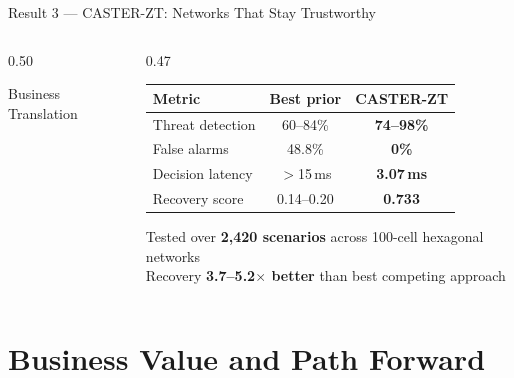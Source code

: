 \documentclass[aspectratio=169,t,10pt]{beamer}
\begin{document}
\begin{frame}[shrink=12]{Result 3 --- CASTER-ZT: Networks That Stay Trustworthy}
\begin{columns}[T]
\begin{column}{0.50\textwidth}
\begin{exampleblock}{\faBriefcase\; Business Translation}
  \end{exampleblock}
\end{column}
\begin{column}{0.47\textwidth}
  \centering\small
  \renewcommand{\arraystretch}{1.35}
  \begin{tabular}{lcc}
    \toprule
    \textbf{Metric} & \textbf{Best prior} & \textbf{CASTER-ZT} \\
    \midrule
    Threat detection  & 60--84\%    & \textbf{74--98\%} \\
    False alarms      & 48.8\%      & \textbf{0\%} \\
    Decision latency  & $>$15\,ms   & \textbf{3.07\,ms} \\
    Recovery score    & 0.14--0.20  & \textbf{0.733} \\
    \bottomrule
  \end{tabular}
  \vspace{6pt}
  {\centering\scriptsize\color{gray!70}
    Tested over \textbf{2,420 scenarios} across 100-cell hexagonal networks\\[1pt]
    Recovery \textbf{3.7--5.2$\times$ better} than best competing approach\par}
\end{column}
\end{columns}
\end{frame}

\section{Business Value and Path Forward}
\end{document}
